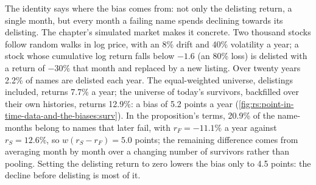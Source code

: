 The identity says where the bias comes from: not only the delisting return, a single month, but every month a failing name
spends declining towards its delisting. The chapter's simulated market makes it concrete. Two thousand stocks follow random
walks in log price, with an 8\% drift and 40\% volatility a year; a stock whose cumulative log return falls below $-1.6$ (an 80\%
loss) is delisted with a return of $-30\%$ that month and replaced by a new listing. Over twenty years 2.2\% of names are delisted
each year. The equal-weighted universe, delistings included, returns 7.7\% a year; the universe of today's survivors,
backfilled over their own histories, returns 12.9\%: a bias of 5.2 points a year
(\cref{fig:rs:point-in-time-data-and-the-biases:surv}). In the proposition's terms, 20.9\% of the name-months belong to names
that later fail, with $r_F = -11.1\%$ a year against $r_S = 12.6\%$, so $w(r_S - r_F) = 5.0$ points; the remaining difference
comes from averaging month by month over a changing number of survivors rather than pooling. Setting the delisting return to
zero lowers the bias only to 4.5 points: the decline before delisting is most of it.

\begin{omfigure}

\label{fig:rs:point-in-time-data-and-the-biases:surv}
\end{omfigure}

